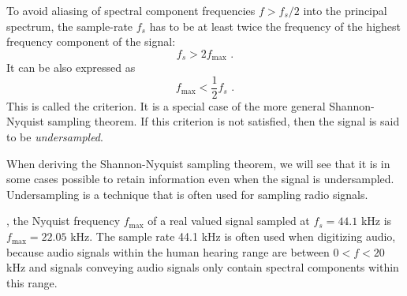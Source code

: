 To avoid aliasing of spectral component frequencies $f>f_s/2$ into the principal spectrum, the sample-rate $f_s$ has to be at least twice the frequency of the highest frequency component of the signal:
\begin{equation}
  \boxed{
    f_s > 2f_{\mathrm{max}}
    }\,\,.
\end{equation}
It can be also expressed as 
\begin{equation}
  \boxed{
    f_{\mathrm{max}}<\frac{1}{2}f_s
    }\,\,.
\end{equation}
This is called the \emph{} criterion. It is a special case of the more general Shannon-Nyquist sampling theorem. If this criterion is not satisfied, then the signal is said to be \emph{undersampled}.

When deriving the Shannon-Nyquist sampling theorem, we will see that it is in some cases possible to retain information even when the signal is undersampled. Undersampling is a technique that is often used for sampling radio signals.

, the Nyquist frequency $f_{\mathrm{max}}$ of a real valued signal sampled at $f_s=44.1$ kHz is $f_{\mathrm{max}}=22.05$ kHz. The sample rate 44.1 kHz is often used when digitizing audio, because audio signals within the human hearing range are between $0<f<20$ kHz and signals conveying audio signals only contain spectral components within this range.

